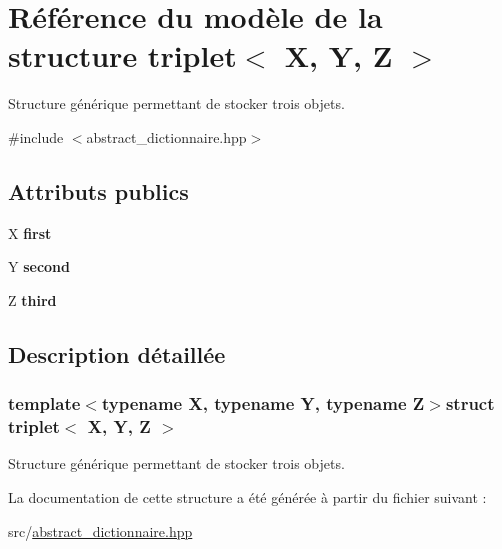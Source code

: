 \hypertarget{structtriplet}{\section{Référence du modèle de la structure triplet$<$ X, Y, Z $>$}
\label{structtriplet}
}


Structure générique permettant de stocker trois objets.  




{\ttfamily \#include $<$abstract\-\_\-dictionnaire.\-hpp$>$}

\subsection*{Attributs publics}
\begin{DoxyCompactItemize}
\item 
\hypertarget{structtriplet_abb054078b3a96581bd22fdcf22b2d9e7}{X {\bfseries first}}\label{structtriplet_abb054078b3a96581bd22fdcf22b2d9e7}

\item 
\hypertarget{structtriplet_ade8bc35f71cffcbe505ede6f1ebfe896}{Y {\bfseries second}}\label{structtriplet_ade8bc35f71cffcbe505ede6f1ebfe896}

\item 
\hypertarget{structtriplet_aabb9092bc2924d46ce68912876e12e3c}{Z {\bfseries third}}\label{structtriplet_aabb9092bc2924d46ce68912876e12e3c}

\end{DoxyCompactItemize}


\subsection{Description détaillée}
\subsubsection*{template$<$typename X, typename Y, typename Z$>$struct triplet$<$ X, Y, Z $>$}

Structure générique permettant de stocker trois objets. 

La documentation de cette structure a été générée à partir du fichier suivant \-:\begin{DoxyCompactItemize}
\item 
src/\hyperlink{abstract__dictionnaire_8hpp}{abstract\-\_\-dictionnaire.\-hpp}\end{DoxyCompactItemize}
